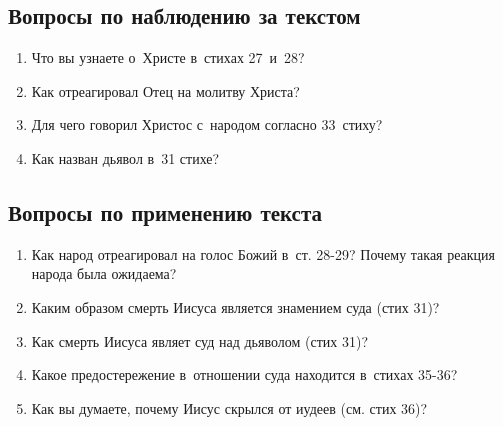 \documentclass[a4paper,12pt]{article}
\begin{document}
\subsection*{Вопросы по наблюдению за текстом}
\begin{enumerate}
    \item Что вы узнаете о~Христе в~стихах 27~и~28? 
    
    \myline
    
    \myline
    \item Как отреагировал Отец на молитву Христа? 
    
    \myline
    
    \myline
    \item Для чего говорил Христос с~народом согласно 33~стиху? 
    
    \myline
    
    \myline
    \item Как назван дьявол в~31 стихе? 
    
    \myline
    
    \myline
\end{enumerate}

\subsection*{Вопросы по применению текста} 
\begin{enumerate}
    \item Как народ отреагировал на голос Божий в~ст. 28-29? Почему такая реакция народа была ожидаема? 
    
    \myline
    
    \myline
    \item Каким образом смерть Иисуса является знамением суда (стих 31)? 
    
    \myline
    
    \myline
    \item Как смерть Иисуса являет суд над дьяволом (стих 31)? 
    
    \myline
    
    \myline
    \item Какое предостережение в~отношении суда находится в~стихах 35-36? 
    
    \myline
    
    \myline
    \item Как вы думаете, почему Иисус скрылся от иудеев (см. стих 36)? 
    
    \myline
    
    \myline
\end{enumerate}
\end{document}

